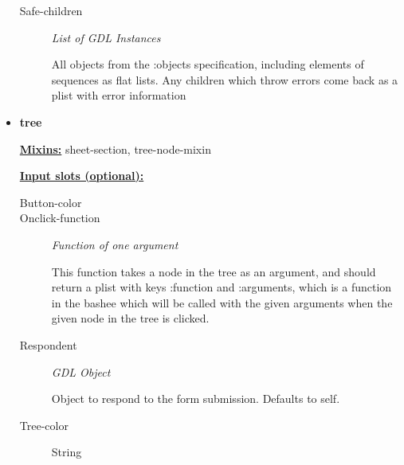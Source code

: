 \documentclass [11pt]{book}
\begin{document}
\begin{itemize}
\begin{description}
\item [Safe-children]
\emph{List of GDL Instances}

 All objects from the :objects specification, including elements of sequences
as flat lists. Any children which throw errors come back as a plist with error information




\end{description}







\item {}
\label{prim:tree}
\textbf{tree}


\textbf{
\underline{Mixins:}} sheet-section, tree-node-mixin







\textbf{
\underline{Input slots (optional):}}

\begin{description}

\item [Button-color]





\item [Onclick-function]
\emph{Function of one argument}

 This function takes a node in the tree as an argument, and should return
a plist with keys :function and :arguments, which is a function in the bashee which will be called
with the given arguments when the given node in the tree is clicked.




\item [Respondent]
\emph{GDL Object}

 Object to respond to the form submission. Defaults to self.




\item [Tree-color]

String




\end{description}







\end{itemize}
\end{document}
